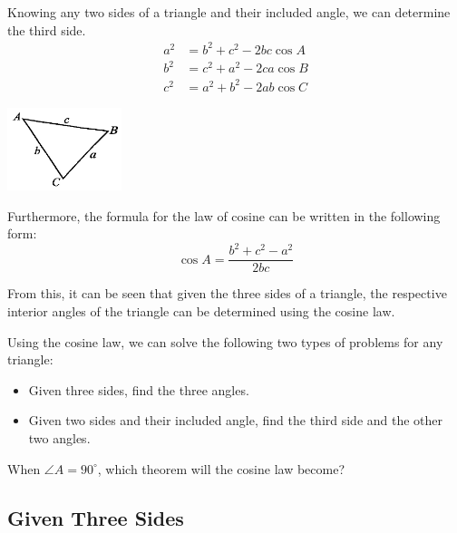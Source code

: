 \documentclass{report}
\begin{document}
    \newpage
    \begin{info}
        \begin{vwcol}[widths={0.6,0.4}, sep=8mm, rule=0pt]
            Knowing any two sides of a triangle and their included angle, we can determine the third side.
            \begin{align*}
                a^2 &= b^2 + c^2 - 2bc \cos A \\
                b^2 &= c^2 + a^2 - 2ca \cos B \\
                c^2 &= a^2 + b^2 - 2ab \cos C
            \end{align*}
    
            \includegraphics[width=0.25\textwidth]{assets/10-21.jpg}
        \end{vwcol}
    \end{info}

    Furthermore, the formula for the law of cosine can be written in the following form:
    $$
    \cos A=\dfrac{b^{2}+c^{2}-a^{2}}{2 b c}
    $$

    \vspace{-1em}
    From this, it can be seen that given the three sides of a triangle, the respective interior angles of the triangle can be determined using the cosine law.

    Using the cosine law, we can solve the following two types of problems for any triangle:
    \vspace{-1em}
    \begin{itemize}
        \item Given three sides, find the three angles.
        \item Given two sides and their included angle, find the third side and the other two angles.
    \end{itemize}

    \begin{think}

    \noindent When $\angle A=90^{\circ}$, which theorem will the cosine law become?
    \end{think}

    \subsection*{Given Three Sides}
\end{document}
